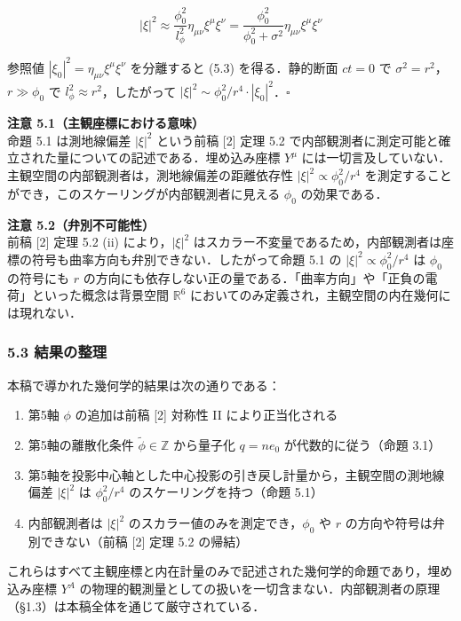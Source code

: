 \documentclass[a4paper,11pt]{ltjsarticle}
\theoremstyle{definition}
\begin{document}
\[|\xi|^2 \approx \frac{\phi_0^2}{l_\phi^2}\eta_{\mu\nu}\xi^\mu\xi^\nu = \frac{\phi_0^2}{\phi_0^2 + \sigma^2}\eta_{\mu\nu}\xi^\mu\xi^\nu\]

参照値 \(|\xi_0|^2 = \eta_{\mu\nu}\xi^\mu\xi^\nu\) を分離すると (5.3) を得る．静的断面 \(ct = 0\) で \(\sigma^2 = r^2\)，\(r \gg \phi_0\) で \(l_\phi^2 \approx r^2\)，したがって \(|\xi|^2 \sim \phi_0^2/r^4 \cdot |\xi_0|^2\)．\(\square\)

\textbf{注意 5.1（主観座標における意味）}\\
命題 5.1 は測地線偏差 \(|\xi|^2\) という前稿 {[}2{]} 定理 5.2 で内部観測者に測定可能と確立された量についての記述である．埋め込み座標 \(Y^\mu\) には一切言及していない．主観空間の内部観測者は，測地線偏差の距離依存性 \(|\xi|^2 \propto \phi_0^2/r^4\) を測定することができ，このスケーリングが内部観測者に見える \(\phi_0\) の効果である．

\textbf{注意 5.2（弁別不可能性）}\\
前稿 {[}2{]} 定理 5.2 (ii) により，\(|\xi|^2\) はスカラー不変量であるため，内部観測者は座標の符号も曲率方向も弁別できない．したがって命題 5.1 の \(|\xi|^2 \propto \phi_0^2/r^4\) は \(\phi_0\) の符号にも \(r\) の方向にも依存しない正の量である．「曲率方向」や「正負の電荷」といった概念は背景空間 \(\mathbb{R}^6\) においてのみ定義され，主観空間の内在幾何には現れない．

\subsubsection{5.3 結果の整理}\label{ux7d50ux679cux306eux6574ux7406}

本稿で導かれた幾何学的結果は次の通りである：

\begin{enumerate}
\def\labelenumi{\arabic{enumi}.}
\tightlist
\item
  第5軸 \(\phi\) の追加は前稿 {[}2{]} 対称性 II により正当化される
\item
  第5軸の離散化条件 \(\tilde{\phi} \in \mathbb{Z}\) から量子化 \(q = n e_0\) が代数的に従う（命題 3.1）
\item
  第5軸を投影中心軸とした中心投影の引き戻し計量から，主観空間の測地線偏差 \(|\xi|^2\) は \(\phi_0^2/r^4\) のスケーリングを持つ（命題 5.1）
\item
  内部観測者は \(|\xi|^2\) のスカラー値のみを測定でき，\(\phi_0\) や \(r\) の方向や符号は弁別できない（前稿 {[}2{]} 定理 5.2 の帰結）
\end{enumerate}

これらはすべて主観座標と内在計量のみで記述された幾何学的命題であり，埋め込み座標 \(Y^A\) の物理的観測量としての扱いを一切含まない．内部観測者の原理（§1.3）は本稿全体を通じて厳守されている．
\end{document}

